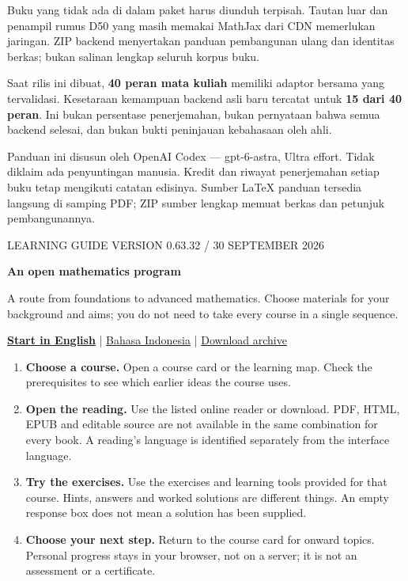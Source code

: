\documentclass[11pt,a4paper]{article}
\newcommand{\heading}[1]{\par\medskip{\large\bfseries\color{ink}#1}\par\smallskip}
\newcommand{\idsite}{https://kokunoyumeto.github.io/program-matematika-indonesia/id/}
\newcommand{\ensite}{https://kokunoyumeto.github.io/program-matematika-indonesia/en/}
\newcommand{\doiurl}{https://doi.org/10.5281/zenodo.22059707}
\begin{document}
Buku yang tidak ada di dalam paket harus diunduh terpisah. Tautan luar dan
penampil rumus D50 yang masih memakai MathJax dari CDN memerlukan jaringan.
ZIP backend menyertakan panduan pembangunan ulang dan identitas berkas;
bukan salinan lengkap seluruh korpus buku.

Saat rilis ini dibuat, \textbf{40 peran mata kuliah} memiliki adaptor bersama
yang tervalidasi. Kesetaraan kemampuan backend asli baru tercatat untuk
\textbf{15 dari 40 peran}. Ini bukan persentase penerjemahan, bukan pernyataan
bahwa semua backend selesai, dan bukan bukti peninjauan kebahasaan oleh ahli.

\vfill
{\footnotesize Panduan ini disusun oleh OpenAI Codex --- gpt-6-astra, Ultra effort.
Tidak diklaim ada penyuntingan manusia. Kredit dan riwayat penerjemahan setiap
buku tetap mengikuti catatan edisinya. Sumber LaTeX panduan tersedia langsung
di samping PDF; ZIP sumber lengkap memuat berkas dan petunjuk pembangunannya.}

\newpage
{\small\color{teal}LEARNING GUIDE \hfill VERSION 0.63.32 / 30 SEPTEMBER 2026}

{\LARGE\bfseries\color{ink}An open mathematics program}

A route from foundations to advanced mathematics. Choose materials for your
background and aims; you do not need to take every course in a single sequence.

\href{\ensite}{\textbf{Start in English}}
\quad | \quad \href{\idsite}{Bahasa Indonesia}
\quad | \quad \href{\doiurl}{Download archive}

\heading{Start learning}
\begin{enumerate}
\item \textbf{Choose a course.} Open a course card or the learning map.
Check the prerequisites to see which earlier ideas the course uses.
\item \textbf{Open the reading.} Use the listed online reader or download.
PDF, HTML, EPUB and editable source are not available in the same combination
for every book. A reading's language is identified separately from the
interface language.
\item \textbf{Try the exercises.} Use the exercises and learning tools provided
for that course. Hints, answers and worked solutions are different things.
An empty response box does not mean a solution has been supplied.
\item \textbf{Choose your next step.} Return to the course card for onward
topics. Personal progress stays in your browser, not on a server; it is not
an assessment or a certificate.
\end{enumerate}
\end{document}
